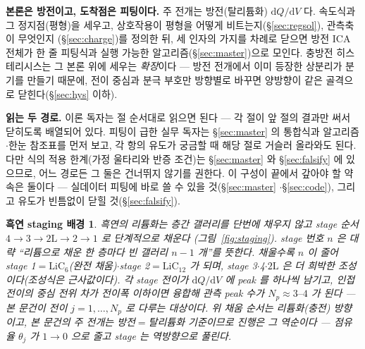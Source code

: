\documentclass[11pt,a4paper]{article}
\newtheorem*{stagebox}{흑연 staging 배경}
\newcommand{\dd}{\mathrm{d}}
\begin{document}
\textbf{본론은 방전이고, 도착점은 피팅이다.} 주 전개는 방전(탈리튬화) $\dd Q/\dd V$ 다. 속도식과 그
정지점(평형)을 세우고, 상호작용이 평형을 어떻게 비트는지(\S\ref{sec:regsol}), 관측축이 무엇인지
(\S\ref{sec:charge})를 정의한 뒤, 세 인자의 가지를 차례로 닫으면 방전 ICA 전체가 한 줄 피팅식과 실행
가능한 알고리즘(\S\ref{sec:master})으로 모인다. 충방전 히스테리시스는 그 본론 위에 세우는 \emph{확장}이다 —
방전 전개에서 이미 등장한 상분리가 분기를 만들기 때문에, 전이 중심과 분극 부호만 방향별로 바꾸면 양방향이
같은 골격으로 닫힌다(\S\ref{sec:hys} 이하).

\textbf{읽는 두 경로.} 이론 독자는 절 순서대로 읽으면 된다 — 각 절이 앞 절의 결과만 써서 닫히도록 배열되어
있다. 피팅이 급한 실무 독자는 \S\ref{sec:master} 의 통합식과 알고리즘$\cdot$한눈 참조표를 먼저 보고, 각 항의
유도가 궁금할 때 해당 절로 거슬러 올라와도 된다. 다만 식의 적용 한계(가정 울타리와 반증 조건)는
\S\ref{sec:master} 와 \S\ref{sec:falsify} 에 있으므로, 어느 경로든 그 둘은 건너뛰지 않기를 권한다.
이 구성이 끝에서 갚아야 할 약속은 둘이다 — 실데이터 피팅에 바로 쓸 수 있을 것(\S\ref{sec:master}
$\cdot$\S\ref{sec:code}), 그리고 유도가 빈틈없이 닫힐 것(\S\ref{sec:falsify}).

\begin{stagebox}
흑연의 리튬화는 층간 갤러리를 단번에 채우지 않고 \emph{stage} 순서 $4\to3\to2\mathrm L\to2\to1$ 로 단계적으로
채운다 \cite{dahn1991,ohzuku1993}(그림~\ref{fig:staging}). stage 번호 $n$ 은 대략 ``리튬으로 채운 한 층마다 빈 갤러리 $n-1$ 개''를
뜻한다. 채울수록 $n$ 이 줄어 stage 1$=\mathrm{LiC_6}$(완전 채움)$\cdot$stage 2$=\mathrm{LiC_{12}}$ 가 되며,
stage 3$\cdot$4$\cdot$$2\mathrm L$ 은 더 희박한 조성이다(조성식은 근사값이다). 각 stage 전이가 $\dd Q/\dd V$ 에 peak 를 하나씩
남기고, 인접 전이의 중심 전위 차가 전이폭 이하이면 융합해 관측 peak 수가 $N_p\approx3\text{--}4$ 가 된다 — 본
문건이 전이 $j=1,\dots,N_p$ 로 다루는 대상이다. 위 채움 순서는 리튬화(충전) 방향이고, 본 문건의 주 전개는
방전$=$탈리튬화 기준이므로 진행은 그 역순이다 — 점유율 $\theta_j$ 가 $1\to0$ 으로 줄고 stage 는 역방향으로
풀린다.
\end{stagebox}
\end{document}

